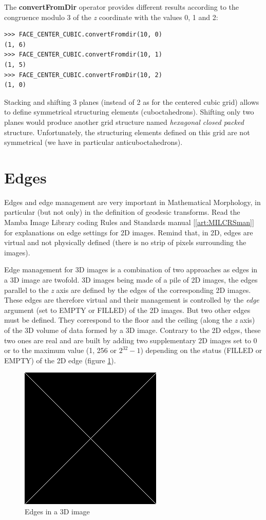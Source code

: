 \documentclass[a4paper,10pt,oneside]{article}
\begin{document}
The \textbf{convertFromDir} operator provides different results according to the congruence modulo 3 of the \emph{z} coordinate with the values
0, 1 and 2:

\lstset{language=Python}
\begin{lstlisting}
>>> FACE_CENTER_CUBIC.convertFromdir(10, 0)
(1, 6)
>>> FACE_CENTER_CUBIC.convertFromdir(10, 1)
(1, 5)
>>> FACE_CENTER_CUBIC.convertFromDir(10, 2)
(1, 0)
\end{lstlisting}

Stacking and shifting 3 planes (instead of 2 as for the centered cubic grid) allows to define symmetrical structuring elements (cuboctahedrons).
Shifting only two planes would produce another grid structure named \textit{hexagonal closed packed} structure. Unfortunately, the structuring
elements defined on this grid are not symmetrical (we have in particular anticuboctahedrons).

\section{Edges}
Edges and edge management are very important in Mathematical Morphology, in particular (but not only) in  the definition of geodesic transforms.
Read the Mamba Image Library coding Rules and Standards manual [\ref{art:MILCRSman}] for explanations on edge settings for 2D images. Remind that,
in 2D, edges are virtual and not physically defined (there is no strip of pixels surrounding the images).

Edge management for 3D images is a combination of two approaches as edges in a 3D image are twofold. 3D images being made of a pile of 2D
images, the edges parallel to the \emph{z} axis are defined by the edges of the corresponding 2D images. These edges are therefore virtual and their management
is controlled by the \textit{edge} argument (set to EMPTY or FILLED) of the 2D images. But two other edges must be defined. They correspond
to the floor and the ceiling (along the \emph{z} axis) of the 3D volume of data formed by a 3D image. Contrary to the 2D edges, these two ones are
real and are built by adding two supplementary 2D images set to 0 or to the maximum value (1, 256 or $2^{32} - 1$) depending on the status (FILLED or EMPTY)
of the 2D edge (figure \ref{fig:3D_edges}).

\begin{figure}
\centering
\includegraphics[scale=0.3]{figures/xxx.png}
\caption{Edges in a 3D image}
\label{fig:3D_edges}
\end{figure}
\end{document}

